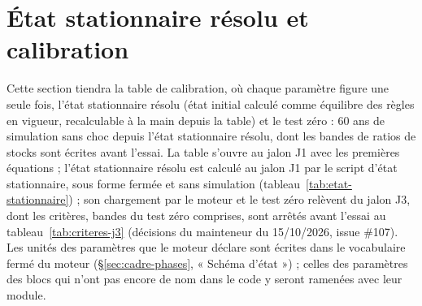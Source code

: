 \documentclass[11pt,a4paper]{article}
\begin{document}
\section{État stationnaire résolu et calibration}
\label{sec:calibration}
Cette section tiendra la table de calibration, où chaque paramètre figure une seule fois, l'état stationnaire résolu (état initial calculé comme équilibre des règles en vigueur, recalculable à la main depuis la table) et le test zéro : 60 ans de simulation sans choc depuis l'état stationnaire résolu, dont les bandes de ratios de stocks sont écrites avant l'essai. La table s'ouvre au jalon J1 avec les premières équations ; l'état stationnaire résolu est calculé au jalon J1 par le script d'état stationnaire, sous forme fermée et sans simulation (tableau~\ref{tab:etat-stationnaire}) ; son chargement par le moteur et le test zéro relèvent du jalon J3, dont les critères, bandes du test zéro comprises, sont arrêtés avant l'essai au tableau~\ref{tab:criteres-j3} (décisions du mainteneur du 15/10/2026, issue \#107). Les unités des paramètres que le moteur déclare sont écrites dans le vocabulaire fermé du moteur (\S\ref{sec:cadre-phases}, « Schéma d'état ») ; celles des paramètres des blocs qui n'ont pas encore de nom dans le code y seront ramenées avec leur module.
\end{document}

